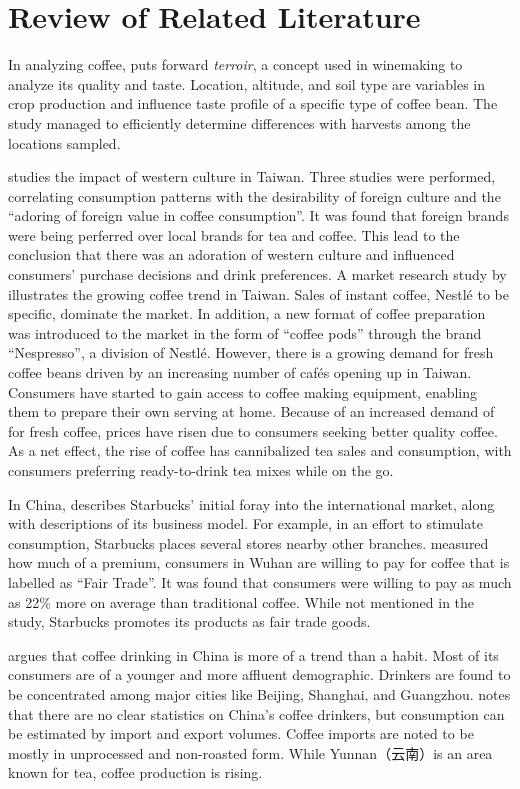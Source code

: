 \section{Review of Related Literature}\label{sec:rrl}

In analyzing coffee, \textcite{silva_characterization_2014} puts forward
\emph{terroir}, a concept used in winemaking to analyze its quality and taste.
Location, altitude, and soil type are variables in crop production and influence
taste profile of a specific type of coffee bean. The study managed to
efficiently determine differences with harvests among the locations sampled.

\textcite{su_impact_2006} studies the impact of western culture in Taiwan. Three
studies were performed, correlating consumption patterns with the desirability
of foreign culture and the ``adoring of foreign value in coffee consumption''.
It was found that foreign brands were being perferred over local brands for tea
and coffee. This lead to the conclusion that there was an adoration of western
culture and influenced consumers' purchase decisions and drink preferences. A
market research study by \textcite{euromonitor_international_coffee_2015}
illustrates the growing coffee trend in Taiwan. Sales of instant coffee, Nestlé
to be specific, dominate the market. In addition, a new format of coffee
preparation was introduced to the market in the form of ``coffee pods'' through
the brand ``Nespresso'', a division of Nestlé. However, there is a growing
demand for fresh coffee beans driven by an increasing number of cafés opening up
in Taiwan. Consumers have started to gain access to coffee making equipment,
enabling them to prepare their own serving at home. Because of an increased
demand of for fresh coffee, prices have risen due to consumers seeking better
quality coffee. As a net effect, the rise of coffee has cannibalized tea sales
and consumption, with consumers preferring ready-to-drink tea mixes while on the
go.

In China, \textcite{harrison_exporting_2005} describes Starbucks' initial foray
into the international market, along with descriptions of its business model.
For example, in an effort to stimulate consumption, Starbucks places several
stores nearby other branches. \textcite{yang_consumer_2012} measured how much of
a premium, consumers in Wuhan are willing to pay for coffee that is labelled as
``Fair Trade''. It was found that consumers were willing to pay as much as 22\%
more on average than traditional coffee. While not mentioned in the study,
Starbucks promotes its products as fair trade goods.

\textcite{zhang_coffee_2014} argues that coffee drinking in China is more of a
trend than a habit. Most of its consumers are of a younger and more affluent
demographic. Drinkers are found to be concentrated among major cities like
Beijing, Shanghai, and Guangzhou.
\textcite{international_coffee_council_coffee_2015} notes that there are no
clear statistics on China's coffee drinkers, but consumption can be estimated by
import and export volumes. Coffee imports are noted to be mostly in unprocessed
and non-roasted form. While Yunnan（云南）is an area known for tea, coffee
production is rising.
